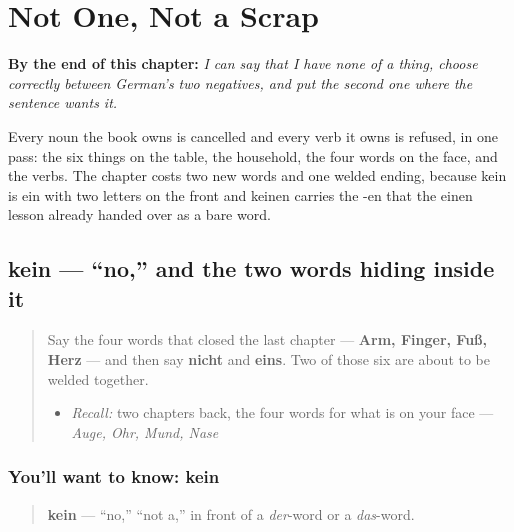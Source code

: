 
\chapter{Not One, Not a Scrap}
\label{ch:ge-negation}

\begin{chapteropening}
\textbf{By the end of this chapter:} \emph{I can say that I have none of a thing, choose correctly between German's two negatives, and put the second one where the sentence wants it.}

Every noun the book owns is cancelled and every verb it owns is refused, in one pass: the six things on the table, the household, the four words on the face, and the verbs. The chapter costs two new words and one welded ending, because kein is ein with two letters on the front and keinen carries the -en that the einen lesson already handed over as a bare word.
\end{chapteropening}

\section[kein]{kein — \textquotedblleft{}no,\textquotedblright{} and the two words hiding inside it}

\label{lesson:GE-C32-kein}



\begin{quote}
Say the four words that closed the last chapter — \textbf{Arm, Finger, Fuß, Herz} — and then say \textbf{nicht} and \textbf{eins}. Two of those six are about to be welded together.

\begin{itemize}
\raggedright
  \item \emph{Recall:} two chapters back, the four words for what is on your face — \emph{Auge, Ohr, Mund, Nase}
\end{itemize}
\end{quote}

\subsection*{You'll want to know: kein}
\begin{quote}
\textbf{kein} — \textquotedblleft{}no,\textquotedblright{} \textquotedblleft{}not a,\textquotedblright{} in front of a \emph{der}-word or a \emph{das}-word.
\end{quote}

